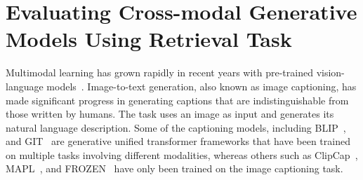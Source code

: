\section{Evaluating Cross-modal Generative Models Using Retrieval Task}
\label{sec:gnn_exp_bench}

Multimodal learning has grown rapidly in recent years with pre-trained vision-language models~\cite{CLIP, VILT}. Image-to-text generation, also known as image captioning, has made significant progress in generating captions that are indistinguishable from those written by humans. The task uses an image as input and generates its natural language description. Some of the captioning models, including BLIP~\cite{BLIP}, and GIT~\cite{GIT} are generative unified transformer frameworks that have been trained on multiple tasks involving different modalities, whereas others such as ClipCap~\cite{ClipCap}, MAPL~\cite{MAPL}, and FROZEN~\cite{Frozen} have only been trained on the image captioning task. 

